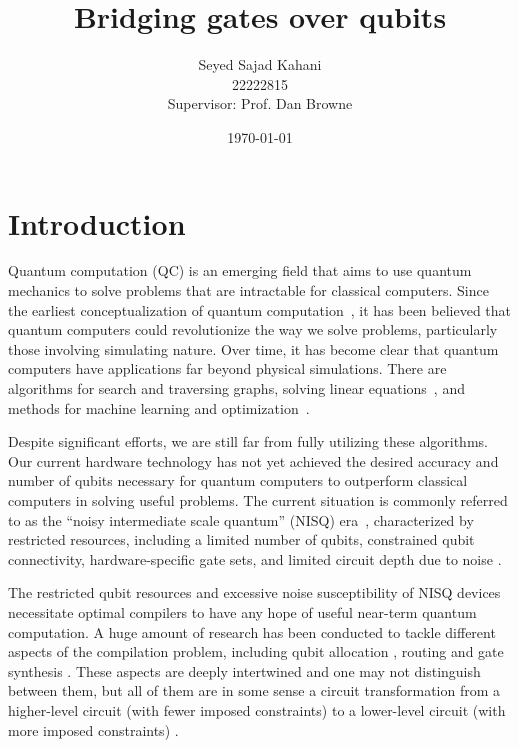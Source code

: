 \documentclass{report}
\title{Bridging gates over qubits}
\author{Seyed Sajad Kahani \\ 22222815 \\Supervisor: Prof. Dan Browne}
\date{\today}
\begin{document}
\maketitle

\tableofcontents

\begin{abstract}
  
\end{abstract}

\chapter{Introduction}

Quantum computation (QC) is an emerging field that aims to use quantum mechanics to solve problems that are intractable for classical computers. Since the earliest conceptualization of quantum computation~\cite{feynman1986}, it has been believed that quantum computers could revolutionize the way we solve problems, particularly those involving simulating nature. Over time, it has become clear that quantum computers have applications far beyond physical simulations. There are algorithms for search and traversing graphs, solving linear equations~\cite{montanaro2016}, and methods for machine learning and optimization~\cite{jordan2023}.

Despite significant efforts, we are still far from fully utilizing these algorithms. Our current hardware technology has not yet achieved the desired accuracy and number of qubits necessary for quantum computers to outperform classical computers in solving useful problems. The current situation is commonly referred to as the ``noisy intermediate scale quantum'' (NISQ) era~\cite{preskill2018}, characterized by restricted resources, including a limited number of qubits, constrained qubit connectivity, hardware-specific gate sets, and limited circuit depth due to noise \cite{cross2019}.

The restricted qubit resources and excessive noise susceptibility of NISQ devices necessitate optimal compilers to have any hope of useful near-term quantum computation. A huge amount of research has been conducted to tackle different aspects of the compilation problem, including qubit allocation \cite{itoko2019,siraichi2018,paler2019,zhang2021,li2019}, routing \cite{childs,zhou2020,itoko2019,cowtan2019,nash2020,kissinger2019} and gate synthesis \cite{shende2006,vatan2004,vatan2004a,shende2004,barenco1995,dawson2006}. These aspects are deeply intertwined and one may not distinguish between them, but all of them are in some sense a circuit transformation from a higher-level circuit (with fewer imposed constraints) to a lower-level circuit (with more imposed constraints) \cite{hundt2022}.
\end{document}
